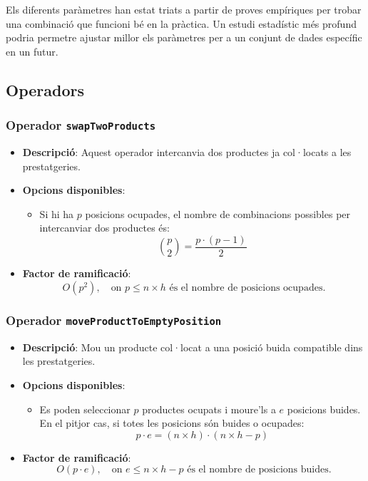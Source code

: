 \documentclass[a4paper,12pt]{report}
\begin{document}
\begin{itemize}
Els diferents paràmetres han estat triats a partir de proves empíriques per trobar una combinació que funcioni bé en la pràctica. Un estudi estadístic més profund podria permetre ajustar millor els paràmetres per a un conjunt de dades específic en un futur.

\subsection {Operadors}

\subsubsection{Operador \texttt{swapTwoProducts}}
\begin{itemize}
    \item \textbf{Descripció}: Aquest operador intercanvia dos productes ja col·locats a les prestatgeries.
    \item \textbf{Opcions disponibles}: 
    \begin{itemize}
        \item Si hi ha \(p\) posicions ocupades, el nombre de combinacions possibles per intercanviar dos productes és:
        \[
        \binom{p}{2} = \frac{p \cdot (p - 1)}{2}
        \]
    \end{itemize}
    \item \textbf{Factor de ramificació}:
    \[
    O(p^2), \quad \text{on } p \leq n \times h \text{ és el nombre de posicions ocupades.}
    \]
\end{itemize}

\subsubsection{Operador \texttt{moveProductToEmptyPosition}}
\begin{itemize}
    \item \textbf{Descripció}: Mou un producte col·locat a una posició buida compatible dins les prestatgeries.
    \item \textbf{Opcions disponibles}: 
    \begin{itemize}
        \item Es poden seleccionar \(p\) productes ocupats i moure'ls a \(e\) posicions buides. En el pitjor cas, si totes les posicions són buides o ocupades:
        \[
        p \cdot e = (n \times h) \cdot (n \times h - p)
        \]
    \end{itemize}
    \item \textbf{Factor de ramificació}:
    \[
    O(p \cdot e), \quad \text{on } e \leq n \times h - p \text{ és el nombre de posicions buides.}
    \]
\end{itemize}


\end{itemize}
\end{document}
